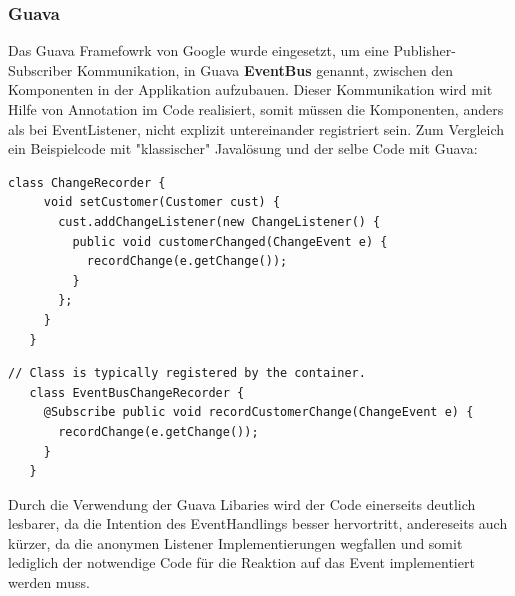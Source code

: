 \documentclass[a4paper,12pt]{article}
\begin{document}
\subsubsection{Guava}
Das Guava Framefowrk von Google wurde eingesetzt, um eine Publisher-Subscriber Kommunikation, in Guava \textbf{EventBus} genannt, zwischen den Komponenten in der Applikation aufzubauen. Dieser Kommunikation wird mit Hilfe von Annotation im Code realisiert, somit müssen die Komponenten, anders als bei EventListener, nicht explizit untereinander registriert sein. Zum Vergleich ein Beispielcode mit "klassischer" Javalösung und der selbe Code mit Guava:\\
\lstset{language=Java}
\begin{lstlisting}[caption={klassische Javalösung \cite{guava-libaries} }]
    class ChangeRecorder {
     void setCustomer(Customer cust) {
       cust.addChangeListener(new ChangeListener() {
         public void customerChanged(ChangeEvent e) {
           recordChange(e.getChange());
         }
       };
     }
   }
\end{lstlisting}\newpage
\lstset{language=Java}
\begin{lstlisting}[caption={Lösung mit Guava \cite{guava-libaries}}]
    // Class is typically registered by the container.
   class EventBusChangeRecorder {
     @Subscribe public void recordCustomerChange(ChangeEvent e) {
       recordChange(e.getChange());
     }
   }
\end{lstlisting}
Durch die Verwendung der Guava Libaries wird der Code einerseits deutlich lesbarer, da die Intention des EventHandlings besser hervortritt, andereseits auch kürzer, da die anonymen Listener Implementierungen wegfallen und somit lediglich der notwendige Code für die Reaktion auf das Event implementiert werden muss.
\end{document}
